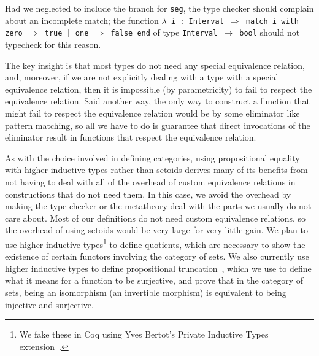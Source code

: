 \documentclass[runningheads]{llncs}
\newcommand{\colortext}[2]{\textcolor{#1}{#2}}
\newcommand{\coqdockw}[1]{\texttt {\colortext{kwred}{#1}}}
\newcommand{\coqdocvar}[1]{\colortext{varpurple}{#1}}
\newcommand{\coqdocind}[1]{\texttt{\colortext{indblue}{#1}}}%
\newcommand{\coqdocconstr}[1]{\texttt {\colortext{constrmaroon}{#1}}}
\newcommand{\coqdocinductive}[1]{\coqdocind{#1}}
\newcommand{\coqdocvariable}[1]{\coqdocvar{#1}}
\newcommand{\coqdocconstructor}[1]{\coqdocconstr{#1}}
\begin{document}
      Had we neglected to include the branch for \texttt{seg}, the type checker should complain about an incomplete match; the function \texttt{\coqdockw{$\lambda$}~\coqdocvariable{i}~:~\coqdocinductive{Interval} $\Rightarrow$~\coqdockw{match}~\coqdocvariable{i}~\coqdockw{with} \coqdocconstructor{zero}~$\Rightarrow$~\coqdocconstructor{true} |~\coqdocconstructor{one}~$\Rightarrow$~\coqdocconstructor{false} \coqdockw{end}} of type \texttt{Interval $\to$ bool} should not typecheck for this reason.

      The key insight is that most types do not need any special equivalence relation, and, moreover, if we are not explicitly dealing with a type with a special equivalence relation, then it is impossible (by parametricity) to fail to respect the equivalence relation.  Said another way, the only way to construct a function that might fail to respect the equivalence relation would be by some eliminator like pattern matching, so all we have to do is guarantee that direct invocations of the eliminator result in functions that respect the equivalence relation.

      As with the choice involved in defining categories, using propositional equality with higher inductive types rather than setoids derives many of its benefits from not having to deal with all of the overhead of custom equivalence relations in constructions that do not need them.  In this case, we avoid the overhead by making the type checker or the metatheory deal with the parts we usually do not care about.  Most of our definitions do not need custom equivalence relations, so the overhead of using setoids would be very large for very little gain.  We plan to use higher inductive types\footnote{We fake these in Coq using Yves Bertot's Private Inductive Types extension~\cite{Bertot2013}.} to define quotients, which are necessary to show the existence of certain functors involving the category of sets.  We also currently use higher inductive types to define propositional truncation~\cite{HoTTBook}, which we use to define what it means for a function to be surjective, and prove that in the category of sets, being an isomorphism (an invertible morphism) is equivalent to being injective and surjective.

\end{document}
